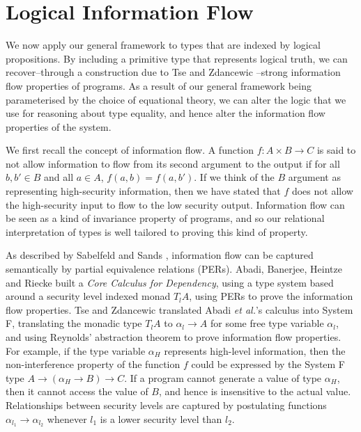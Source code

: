 \section{Logical Information Flow}
\label{sec:information-flow}

\newcommand{\infoflow}{\mathit{Log}}

We now apply our general framework to types that are indexed by
logical propositions. By including a primitive type that represents
logical truth, we can recover--through a construction due to Tse and
Zdancewic \cite{tse04translating}--strong information flow properties
of programs. As a result of our general framework being parameterised
by the choice of equational theory, we can alter the logic that we use
for reasoning about type equality, and hence alter the information
flow properties of the system. 

We first recall the concept of information flow. A function $f : A
\times B \to C$ is said to not allow information to flow from its
second argument to the output if for all $b,b' \in B$ and all $a \in
A$, $f(a,b) = f(a,b')$. If we think of the $B$ argument as
representing high-security information, then we have stated that $f$
does not allow the high-security input to flow to the low security
output. Information flow can be seen as a kind of invariance property
of programs, and so our relational interpretation of types is well
tailored to proving this kind of property.

As described by Sabelfeld and Sands \cite{sabelfeld01per}, information
flow can be captured semantically by partial equivalence relations
(PERs). Abadi, Banerjee, Heintze and Riecke \cite{abadi99core} built a
\emph{Core Calculus for Dependency}, using a type system based around
a security level indexed monad $T_lA$, using PERs to prove the
information flow properties. Tse and Zdancewic \cite{tse04translating}
translated Abadi \emph{et al.}'s calculus into System F, translating the
monadic type $T_lA$ to $\alpha_l \to A$ for some free type variable
$\alpha_l$, and using Reynolds' abstraction theorem to prove
information flow properties. For example, if the type variable
$\alpha_H$ represents high-level information, then the
non-interference property of the function $f$ could be expressed by
the System F type $A \to (\alpha_H \to B) \to C$. If a program cannot
generate a value of type $\alpha_H$, then it cannot access the value
of $B$, and hence is insensitive to the actual value. Relationships
between security levels are captured by postulating functions
$\alpha_{l_1} \to \alpha_{l_2}$ whenever $l_1$ is a lower security
level than $l_2$.

